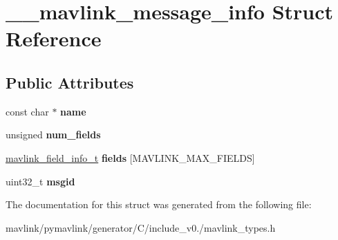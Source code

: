 \hypertarget{struct____mavlink__message__info}{}\section{\+\_\+\+\_\+mavlink\+\_\+message\+\_\+info Struct Reference}
\label{struct____mavlink__message__info}
\subsection*{Public Attributes}
\begin{DoxyCompactItemize}
\item 
\mbox{\label{struct____mavlink__message__info_a0fcc0c1558ed3da428104ba8ee136505}} 
const char $\ast$ {\bfseries name}
\item 
\mbox{\label{struct____mavlink__message__info_a0c343bcc1f27884e8c2ab875e7efc2e5}} 
unsigned {\bfseries num\+\_\+fields}
\item 
\mbox{\label{struct____mavlink__message__info_acecb3dbb50734aa10132dfea73f088dd}} 
\hyperlink{struct____mavlink__field__info}{mavlink\+\_\+field\+\_\+info\+\_\+t} {\bfseries fields} \mbox{[}M\+A\+V\+L\+I\+N\+K\+\_\+\+M\+A\+X\+\_\+\+F\+I\+E\+L\+DS\mbox{]}
\item 
\mbox{\label{struct____mavlink__message__info_a4d2150d2bb5fdaa7da1231f3515d8cc4}} 
uint32\+\_\+t {\bfseries msgid}
\end{DoxyCompactItemize}


The documentation for this struct was generated from the following file\+:\begin{DoxyCompactItemize}
\item 
mavlink/pymavlink/generator/\+C/include\+\_\+v0./mavlink\+\_\+types.\+h\end{DoxyCompactItemize}
